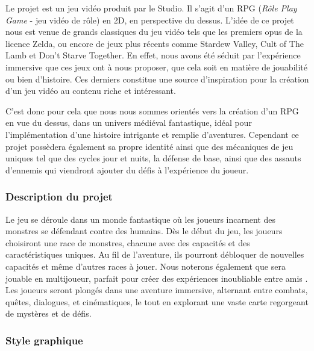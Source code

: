 
\vspace*{0.2cm}

Le projet \textit{\gameName} est un jeu vidéo produit par le Studio.
Il s’agit d’un RPG (\textit{Rôle Play Game} - jeu vidéo de rôle) en 2D, en perspective du dessus.
L’idée de ce projet nous est venue de grands classiques du jeu vidéo tels que les premiers opus de la licence Zelda,
ou encore de jeux plus récents comme Stardew Valley, Cult of The Lamb et Don’t Starve Together.
En effet, nous avons été séduit par l'expérience immersive que ces jeux ont à nous proposer, que cela soit en matière de jouabilité ou bien d’histoire.
Ces derniers constitue une source d'inspiration pour la création d’un jeu vidéo au contenu riche et intéressant.

C’est donc pour cela que nous nous sommes orientés vers la création d’un RPG en vue du dessus, dans un univers médiéval fantastique, 
idéal pour l’implémentation d’une histoire intrigante et remplie d’aventures.
Cependant ce projet possèdera également sa propre identité ainsi que des mécaniques de jeu uniques tel que des cycles jour et nuits, 
la défense de base, ainsi que des assauts d’ennemis qui viendront ajouter du défis à l'expérience du joueur.

\subsubsection*{\hspace*{0.6cm}Description du projet}

Le jeu se déroule dans un monde fantastique où les joueurs incarnent des monstres se défendant contre des humains.
Dès le début du jeu, les joueurs choisiront une race de monstres, chacune avec des capacités et des caractéristiques uniques.
Au fil de l'aventure, ils pourront débloquer de nouvelles capacités et même d'autres races à jouer.
Nous noterons également que \textit{\gameName} sera jouable en multijoueur, parfait pour créer des expériences  inoubliable entre amis .
Les joueurs seront plongés dans une aventure immersive, alternant entre combats, quêtes, dialogues, et cinématiques, 
le tout en explorant une vaste carte regorgeant de mystères et de défis.

\subsubsection*{\hspace*{0.6cm}Style graphique}

